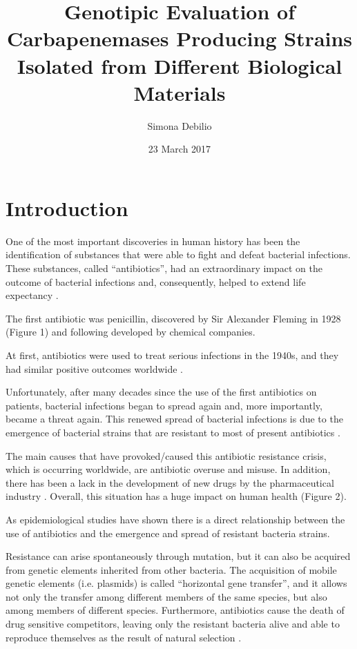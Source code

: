\documentclass[11pt]{report}
\title{\textbf{Genotipic Evaluation of Carbapenemases Producing Strains Isolated from Different Biological Materials}}
\author{Simona Debilio}
\date{23 March 2017}
\begin{document}
\maketitle

\tableofcontents

\chapter{Introduction}
One of the most important discoveries in human history has been the identification of substances that were able to fight and defeat bacterial infections.
These substances, called “antibiotics”, had an extraordinary impact on the outcome of bacterial infections and, consequently, helped to extend life expectancy \cite{ventola2015antibiotic}. 

The first antibiotic was penicillin, discovered by Sir Alexander Fleming in 1928 (Figure 1) and following developed by chemical companies.

At first, antibiotics were used to treat serious infections in the 1940s, and they had similar positive outcomes worldwide \cite{Spellberg2014}.

Unfortunately, after many decades since the use of the first antibiotics on patients, bacterial infections began to spread again and, more importantly, became a threat again.
This renewed spread of bacterial infections is due to the emergence of bacterial strains that are resistant to most of present antibiotics \cite{ventola2015antibiotic}.

The main causes that have provoked/caused this antibiotic resistance crisis, which is occurring worldwide, are antibiotic overuse and misuse. In addition, there has been a lack in the development of new drugs by the pharmaceutical industry \cite{nature2013}. Overall, this situation has a huge impact on human health (Figure 2).

As epidemiological studies have shown there is a direct relationship between the use of antibiotics and the emergence and spread of resistant bacteria strains.

Resistance can arise spontaneously through mutation, but it can also be acquired from genetic elements inherited from other bacteria. The acquisition of mobile genetic elements (i.e. plasmids) is called “horizontal gene transfer”, and it allows not only the transfer among different members of the same species, but also among members of different species.
Furthermore, antibiotics cause the death of drug sensitive competitors, leaving only the resistant bacteria alive and able to reproduce themselves as the result of natural selection \cite{doi:10.1093/emph/eou024}.
\end{document}
